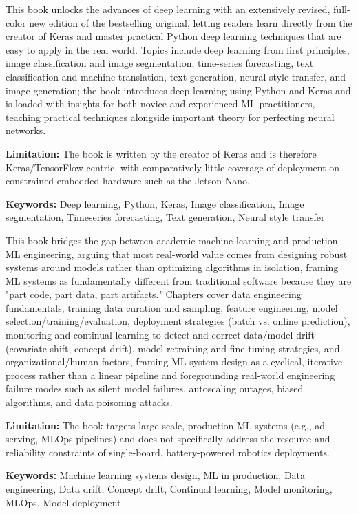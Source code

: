 {
	This book \cite{Chollet:2021} unlocks the advances of deep learning with an extensively revised, full-color new edition of the bestselling original, letting readers learn directly from the creator of Keras and master practical Python deep learning techniques that are easy to apply in the real world. Topics include deep learning from first principles, image classification and image segmentation, time-series forecasting, text classification and machine translation, text generation, neural style transfer, and image generation; the book introduces deep learning using Python and Keras and is loaded with insights for both novice and experienced ML practitioners, teaching practical techniques alongside important theory for perfecting neural networks.
	
	\bigskip
	\textbf{Limitation:} The book is written by the creator of Keras and is therefore Keras/TensorFlow-centric, with comparatively little coverage of deployment on constrained embedded hardware such as the Jetson Nano.
	
	\scriptsize{\textbf{Keywords:} Deep learning, Python, Keras, Image classification, Image segmentation, Timeseries forecasting, Text generation, Neural style transfer}
}

{
	This book \cite{Huyen:2022} bridges the gap between academic machine learning and production ML engineering, arguing that most real-world value comes from designing robust systems around models rather than optimizing algorithms in isolation, framing ML systems as fundamentally different from traditional software because they are "part code, part data, part artifacts." Chapters cover data engineering fundamentals, training data curation and sampling, feature engineering, model selection/training/evaluation, deployment strategies (batch vs. online prediction), monitoring and continual learning to detect and correct data/model drift (covariate shift, concept drift), model retraining and fine-tuning strategies, and organizational/human factors, framing ML system design as a cyclical, iterative process rather than a linear pipeline and foregrounding real-world engineering failure modes such as silent model failures, autoscaling outages, biased algorithms, and data poisoning attacks.
	
	\bigskip
	\textbf{Limitation:} The book targets large-scale, production ML systems (e.g., ad-serving, MLOps pipelines) and does not specifically address the resource and reliability constraints of single-board, battery-powered robotics deployments.
	
	\scriptsize{\textbf{Keywords:} Machine learning systems design, ML in production, Data engineering, Data drift, Concept drift, Continual learning, Model monitoring, MLOps, Model deployment}
}

